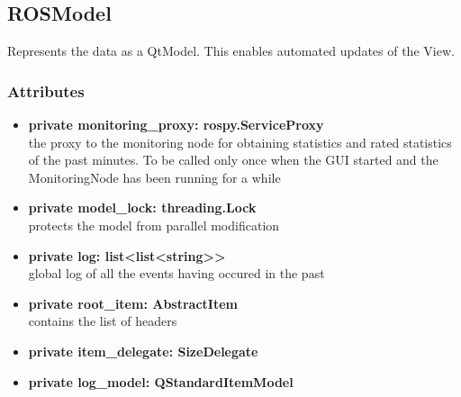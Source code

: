 \subsection{ROSModel}
Represents the data as a QtModel. This enables automated updates of the View.
\subsubsection{Attributes}
\begin{itemize}
  \item \textbf{private monitoring\_proxy: rospy.ServiceProxy}\\ 
  the proxy to the monitoring node for obtaining statistics and rated statistics of the past minutes. To be called only once when the GUI started and the MonitoringNode has been running for a while
  \item \textbf{private model\_lock: threading.Lock}\\ 
  protects the model from parallel modification
  \item \textbf{private log: list<list<string>>}\\ 
  global log of all the events having occured in the past  
  \item \textbf{private root\_item: AbstractItem}\\
  contains the list of headers
  \item \textbf{private item\_delegate: SizeDelegate}\\
  
  \item \textbf{private log\_model: QStandardItemModel}\\
   
\end{itemize}
